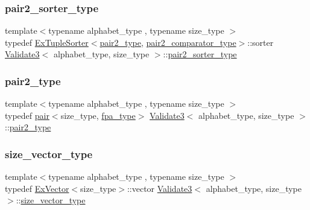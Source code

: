 \mbox{\label{class_validate3_a3a7778ec3337ed3baf9a7515cf0a94ad}} 
\subsubsection{\texorpdfstring{pair2\+\_\+sorter\+\_\+type}{pair2\_sorter\_type}}
{\footnotesize\ttfamily template$<$typename alphabet\+\_\+type , typename size\+\_\+type $>$ \\
typedef \hyperlink{struct_ex_tuple_sorter}{Ex\+Tuple\+Sorter}$<$\hyperlink{class_validate3_aa5a02458227330cbaaf91b58684625f0}{pair2\+\_\+type}, \hyperlink{class_validate3_a9a5316faa3c44f8f5743fec09cdea491}{pair2\+\_\+comparator\+\_\+type}$>$\+::sorter \hyperlink{class_validate3}{Validate3}$<$ alphabet\+\_\+type, size\+\_\+type $>$\+::\hyperlink{class_validate3_a3a7778ec3337ed3baf9a7515cf0a94ad}{pair2\+\_\+sorter\+\_\+type}\hspace{0.3cm}{\ttfamily [private]}}

\mbox{\label{class_validate3_aa5a02458227330cbaaf91b58684625f0}} 
\subsubsection{\texorpdfstring{pair2\+\_\+type}{pair2\_type}}
{\footnotesize\ttfamily template$<$typename alphabet\+\_\+type , typename size\+\_\+type $>$ \\
typedef \hyperlink{structpair}{pair}$<$size\+\_\+type, \hyperlink{common_8h_a7fdaf8b9b3d2f6ae6b10597a8d3f96ee}{fpa\+\_\+type}$>$ \hyperlink{class_validate3}{Validate3}$<$ alphabet\+\_\+type, size\+\_\+type $>$\+::\hyperlink{class_validate3_aa5a02458227330cbaaf91b58684625f0}{pair2\+\_\+type}\hspace{0.3cm}{\ttfamily [private]}}

\mbox{\label{class_validate3_a9dcb1d691c20940089a7e6fbf1619069}} 
\subsubsection{\texorpdfstring{size\+\_\+vector\+\_\+type}{size\_vector\_type}}
{\footnotesize\ttfamily template$<$typename alphabet\+\_\+type , typename size\+\_\+type $>$ \\
typedef \hyperlink{struct_ex_vector}{Ex\+Vector}$<$size\+\_\+type$>$\+::vector \hyperlink{class_validate3}{Validate3}$<$ alphabet\+\_\+type, size\+\_\+type $>$\+::\hyperlink{class_validate3_a9dcb1d691c20940089a7e6fbf1619069}{size\+\_\+vector\+\_\+type}\hspace{0.3cm}{\ttfamily [private]}}

